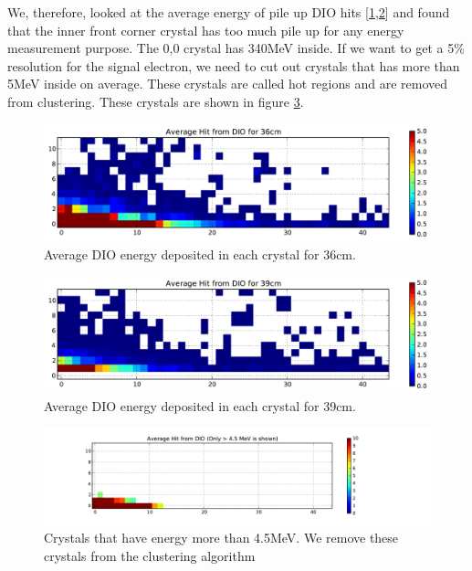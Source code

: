 \documentclass[11pt]{article}
\begin{document}
We, therefore, looked at the average energy of pile up DIO hits [\ref{fig:average_dio_hit_36},\ref{fig:average_dio_hit_39}] and found that the inner front corner crystal has too much pile up for any energy measurement purpose. The 0,0 crystal has 340MeV inside. If we want to get a 5\% resolution for the signal electron, we need to cut out crystals that has more than 5MeV inside on average. These crystals are called hot regions and are removed from clustering. These crystals are shown in figure \ref{fig:removed_crystals}.
\
\begin{figure}[htbp]
   \centering
   \includegraphics[width=\textwidth]{../plot/average_dio_hit_36.pdf} %
   \caption{Average DIO energy deposited in each crystal for 36cm.}
   \label{fig:average_dio_hit_36}
\end{figure}

\begin{figure}[htbp]
   \centering
   \includegraphics[width=\textwidth]{../plot/average_dio_hit_39.pdf} %
   \caption{Average DIO energy deposited in each crystal for 39cm.}
   \label{fig:average_dio_hit_39}
\end{figure}

\begin{figure}[htbp]
   \centering
   \includegraphics[width=\textwidth]{../plot/removed_crystals.pdf} %
   \caption{Crystals that have energy more than 4.5MeV. We remove these crystals from the clustering algorithm}
   \label{fig:removed_crystals}
\end{figure}
\clearpage
\end{document}
